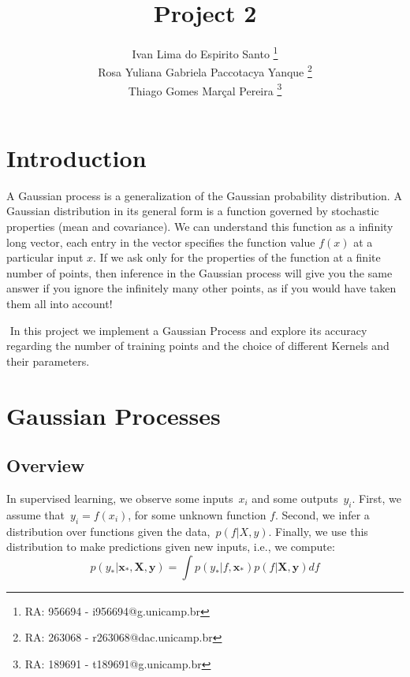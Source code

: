 \documentclass[]{IEEEtran}
\begin{document}
\title{Project 2}
\author{Ivan Lima do Espirito Santo \thanks{RA: 956694 - i956694@g.unicamp.br}\\ Rosa Yuliana Gabriela Paccotacya Yanque \thanks{RA: 263068 - r263068@dac.unicamp.br} \\ Thiago Gomes Marçal Pereira \thanks{RA: 189691 - t189691@g.unicamp.br}}




\maketitle
  
  
\section{Introduction} \label{sec:introduction}
A Gaussian process is a generalization of the Gaussian probability distribution. A Gaussian distribution in its general form is a function governed by stochastic properties (mean and covariance). We can understand this function as a infinity long vector, each entry in the vector specifies the function value \( f(x)\) at a particular input \(x\). If we ask only for the properties of the function at a ﬁnite number of points, then inference in the Gaussian process will give you the same answer if you ignore the inﬁnitely many other points, as if you would have taken them all into account!~\cite{Ras2006}\par\( \)
In this project we implement a Gaussian Process and explore its accuracy regarding the number of training points and the choice of different Kernels and their parameters.


\section{Gaussian Processes}
\subsection{Overview}
In supervised learning, we observe some inputs~\({ x }_{ i }\) and some outputs~\({ y }_{ i }\). First, we assume that~\({ y }_{ i }=f({ x }_{ i })\), for some unknown function \(f\). Second, we infer a distribution over functions given the data,~\( p(f|X,y)\). Finally, we use this distribution to make predictions given new inputs, i.e., we compute:
\begin{equation}
p({ y }_{ * }|\mathbf{{ x }_{ * }},\mathbf{X},\mathbf{y})=\int { p({ y }_{ * }|{ f},\mathbf{{ x }_{ * }}) } p(f|\mathbf{X},\mathbf{y})df
\label{eq01}
\end{equation}
\end{document}
